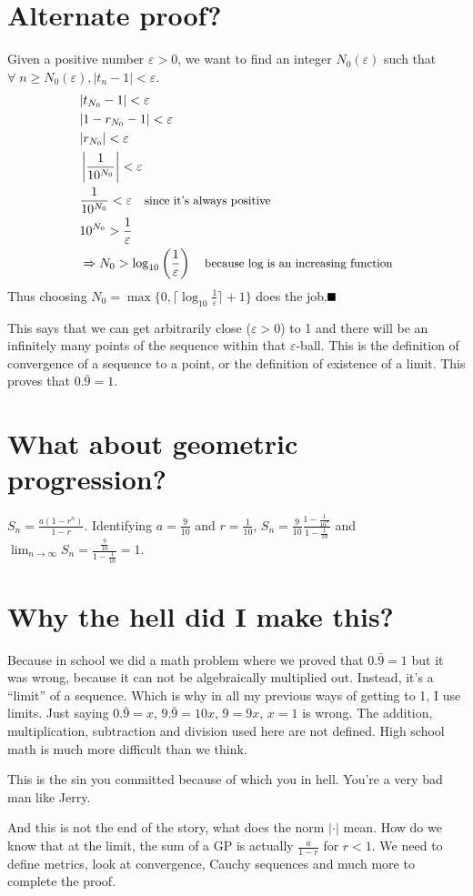 \documentclass[11pt]{article}
\newcommand{\qed}{\mbox{}\hspace*{\fill}\nolinebreak\mbox{$\rule{0.6em}{0.6em}$}}
\begin{document}
\section{Alternate proof?}
Given a positive number \(\varepsilon >0\), we want to find an integer
\(N_0(\varepsilon)\) such that \hbox{\(\forall\; n\ge N_0(\varepsilon), \lvert
t_n-1\rvert <\varepsilon\)}.
\begin{align*}
    &\lvert t_{N_0}-1\rvert < \varepsilon\\
    &\lvert 1-r_{N_0}-1\rvert < \varepsilon\\
    &\lvert r_{N_0}\rvert < \varepsilon\\
    &\left\lvert \frac{1}{10^{N_0}} \right\rvert< \varepsilon\\
    &\frac{1}{10^{N_0}} < \varepsilon\quad\text{\small since it's always
    positive}\\
    &10^{N_0}>\frac{1}{\varepsilon}\\
    &\Rightarrow N_0 > \log_{10}\left(\frac{1}{\varepsilon}\right)\quad\text{\small because log is an
    increasing function}
\end{align*}
Thus choosing \(N_0=\max\{0,\lceil\log_{10}\frac{1}{\varepsilon}\rceil+1\}\) does the
job.\qed\par
This says that we can get arbitrarily close (\(\varepsilon>0\)) to 1 and there
will be an infinitely many points of the sequence within that
\(\varepsilon\)-ball. This is the definition of convergence of a sequence to a
point, or the definition of existence of a limit. This proves that
\(0.\bar{9}=1\).

\section{What about geometric progression?}
\(S_n=\frac{a(1-r^n)}{1-r}\). Identifying \(a=\frac{9}{10}\) and
\(r=\frac{1}{10}\), \(\displaystyle S_n=\frac{9}{10}\frac{1-\frac{1}{10^n}}{1-\frac{1}{10}}\)
and
\(\displaystyle\lim_{n\rightarrow\infty}S_n=\frac{\frac{9}{10}}{1-\frac{1}{10}}=1\).

\section{Why the hell did I make this?}
Because in school we did a math problem where we proved that \(0.\bar{9}=1\) but
it was wrong, because it can not be algebraically multiplied out. Instead, it's a
``limit'' of a sequence. Which is why in all my previous ways of getting to 1, I
use limits. Just saying \(0.\bar{9}=x\), \(9.\bar{9}=10x\), \(9=9x\), \(x=1\) is
wrong. The addition, multiplication, subtraction and division used here are not
defined. High school math is much more difficult than we think. \par
This is the sin you committed because of which you in hell. You're a very bad
man like Jerry.\par
And this is not
the end of the story, what does the norm \(\lvert\cdot\rvert\) mean. How do we
know that at the limit, the sum of a GP is actually \(\frac{a}{1-r}\) for
\(r<1\). We need to define metrics, look at convergence, Cauchy sequences and
much more to complete the proof.
\end{document}
